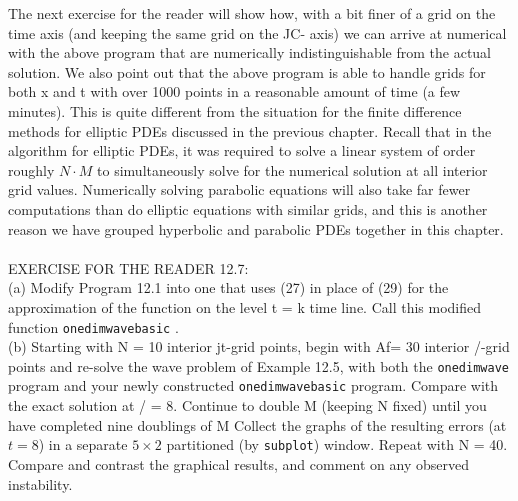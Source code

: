 \documentclass[../main.tex]{subfiles}
\begin{document}
{{The next exercise for the reader will show how, with a bit finer of a grid on the time axis (and keeping the same grid on the JC- axis) we can arrive at numerical  with the above program that are numerically indistinguishable from the actual solution. We also point out that the above program is able to handle grids for both x and t with over 1000 points in a reasonable amount of time (a few minutes). This is quite different from the situation for the finite difference methods for elliptic PDEs discussed in the previous chapter. Recall that in the algorithm for elliptic PDEs, it was required to solve a linear system of order roughly $N \cdot M$ to simultaneously solve for the numerical solution at all interior grid values. Numerically solving parabolic equations will also take far fewer computations than do elliptic equations with similar grids, and this is another reason we have grouped hyperbolic and parabolic PDEs together in this chapter. 
\\
\\
EXERCISE FOR THE READER 12.7: 
\\
(a) Modify Program 12.1 into one that uses (27) in place of (29) for the approximation of the function on the level t = k time line. Call this modified function \texttt{onedimwavebasic} . 
\\
(b) Starting with N = 10 interior jt-grid points, begin with Af= 30 interior /-grid points and re-solve the wave problem of Example 12.5, with both the \texttt{onedimwave} program and your newly constructed \texttt{onedimwavebasic} program. Compare with the exact solution at / = 8. Continue to double M (keeping N fixed) until you have completed nine doublings of M Collect the graphs of the resulting errors (at $t = 8$) in a separate $5\times 2$ partitioned (by \texttt{subplot}) window. Repeat with N = 40. Compare and contrast the graphical results, and comment on any observed instability. 
\\

}}
\end{document}
